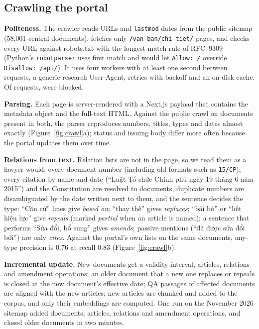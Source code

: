 \documentclass{article} %
\begin{document}
\subsection{Crawling the portal}
\label{sec:crawl}
\textbf{Politeness.} The crawler reads URLs and \texttt{lastmod} dates from the public sitemap (58,001 central documents),
fetches only \texttt{/van-ban/chi-tiet/} pages, and checks every URL against robots.txt with the longest-match rule of
RFC~9309~\citep{rfc9309} (Python's \texttt{robotparser} uses first match and would let \texttt{Allow: /} override
\texttt{Disallow: /api/}). It uses four workers with at least one second between requests, a generic research
User-Agent, retries with backoff and an on-disk cache. Of \CrawlFetched{} requests, \CrawlBlocked{} were blocked.

\textbf{Parsing.} Each page is server-rendered with a Next.js payload that contains the metadata object and the
full-text HTML. Against the public crawl on \ParserDocs{} documents present in both, the parser reproduces numbers,
titles, types and dates almost exactly (Figure~\ref{fig:crawl}a); status and issuing body differ more often because
the portal updates them over time.

\textbf{Relations from text.} Relation lists are not in the page, so we read them as a lawyer would: every document
number (including old formats such as \texttt{15/CP}), every citation by name and date (``Luật Tổ chức Chính phủ ngày 19
tháng 6 năm 2015'') and the Constitution are resolved to documents, duplicate numbers are disambiguated by the date
written next to them, and the sentence decides the type: ``Căn cứ'' lines give \emph{based on}; ``thay thế'' gives
\emph{replaces}; ``bãi bỏ'' or ``hết hiệu lực'' give \emph{repeals} (marked \emph{partial} when an article is
named); a sentence that performs ``Sửa đổi, bổ sung'' gives \emph{amends}; passive mentions (``đã được sửa đổi bởi'') are
only \emph{cites}. Against the portal's own lists on the same documents, any-type precision is 0.76 at recall 0.83
(Figure~\ref{fig:crawl}b).

\textbf{Incremental update.} New documents get a validity interval, articles, relations and amendment operations; an
older document that a new one replaces or repeals is closed at the new document's effective date; QA passages of
affected documents are aligned with the new articles; new articles are chunked and added to the corpus, and only their
embeddings are computed. One run on the November 2026 sitemap added \LiveNewDocs{} documents, \LiveNewArts{} articles,
\LiveNewEdges{} relations and \LiveNewOps{} amendment operations, and closed \LiveClosed{} older documents in two minutes.
\end{document}
